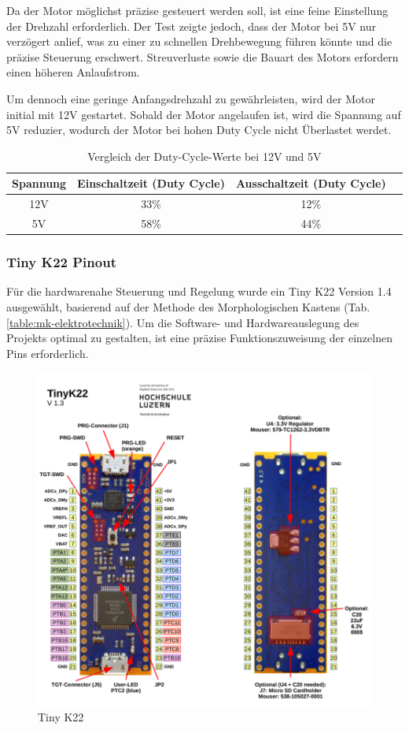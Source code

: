 Da der Motor möglichst präzise gesteuert werden soll, ist eine feine Einstellung der Drehzahl erforderlich. Der Test zeigte jedoch, dass der Motor bei 5V nur verzögert anlief, was zu einer zu schnellen Drehbewegung führen könnte und die präzise Steuerung erschwert. Streuverluste sowie die Bauart des Motors erfordern einen höheren Anlaufstrom.

Um dennoch eine geringe Anfangsdrehzahl zu gewährleisten, wird der Motor initial mit 12V gestartet. Sobald der Motor angelaufen ist, wird die Spannung auf 5V reduzier, wodurch der Motor bei hohen Duty Cycle nicht Überlastet werdet.

\begin{table}[H]
\centering
\begin{tabular}{|c|c|c|c|}
\hline
\textbf{Spannung} & \textbf{Einschaltzeit (Duty Cycle)} & \textbf{Ausschaltzeit (Duty Cycle)} \\ \hline
12V & 33\% & 12\% \\ \hline
5V  & 58\% & 44\% \\ \hline
\end{tabular}
\caption{Vergleich der Duty-Cycle-Werte bei 12V und 5V}
\label{tab:dutycycle}
\end{table}

\subsubsection{Tiny K22 Pinout} \label{Blockdiagramm: Schnittstellen zwischen den Komponenten}

Für die hardwarenahe Steuerung und Regelung wurde ein Tiny K22 Version 1.4 ausgewählt, basierend auf der Methode des Morphologischen Kastens (Tab. \ref{table:mk-elektrotechnik}). Um die Software- und Hardwareauslegung des Projekts optimal zu gestalten, ist eine präzise Funktionszuweisung der einzelnen Pins erforderlich.

\begin{figure}[H]
    \centering
    \includegraphics[width=0.8\linewidth]{img/Tiny_K22_PCB.png}
    \caption{Tiny K22}
    \label{fig:Tiny_K22_PCB}
\end{figure}


